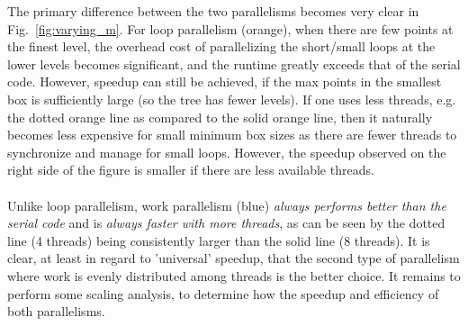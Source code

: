 \documentclass{article}
\begin{document}
The primary difference between the two parallelisms becomes very clear in Fig.~\ref{fig:varying_m}. For loop parallelism (orange), when there are few points at the finest level, the overhead cost of parallelizing the short/small loops at the lower levels becomes significant, and the runtime greatly exceeds that of the serial code. However, speedup can still be achieved, if the max points in the smallest box is sufficiently large (so the tree has fewer levels). If one uses less threads, e.g. the dotted orange line as compared to the solid orange line, then it naturally becomes less expensive for small minimum box sizes as there are fewer threads to synchronize and manage for small loops.  However, the speedup observed on the right side of the figure is smaller if there are less available threads.\\\\
Unlike loop parallelism, work parallelism (blue) \emph{always performs better than the serial code} and is \emph{always faster with more threads}, as can be seen by the dotted line (4 threads) being consistently larger than the solid line (8 threads). It is clear, at least in regard to 'universal' speedup, that the second type of parallelism where work is evenly distributed among threads is the better choice. It remains to perform some scaling analysis, to determine how the speedup and efficiency of both parallelisms.
\end{document}

